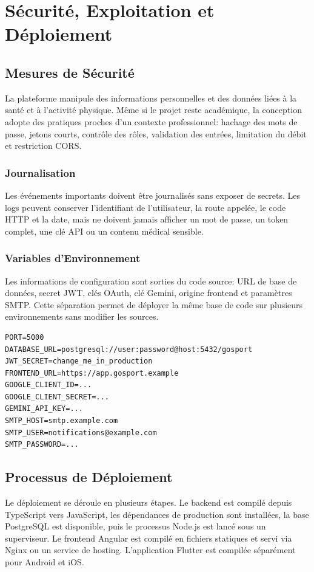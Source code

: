 \chapter{Sécurité, Exploitation et Déploiement}
\minitoc
\newpage

\section{Mesures de Sécurité}
La plateforme manipule des informations personnelles et des données liées à la santé et à l'activité physique. Même si le projet reste académique, la conception adopte des pratiques proches d'un contexte professionnel: hachage des mots de passe, jetons courts, contrôle des rôles, validation des entrées, limitation du débit et restriction CORS.

\subsection{Journalisation}
Les événements importants doivent être journalisés sans exposer de secrets. Les logs peuvent conserver l'identifiant de l'utilisateur, la route appelée, le code HTTP et la date, mais ne doivent jamais afficher un mot de passe, un token complet, une clé API ou un contenu médical sensible.

\subsection{Variables d'Environnement}
Les informations de configuration sont sorties du code source: URL de base de données, secret JWT, clés OAuth, clé Gemini, origine frontend et paramètres SMTP. Cette séparation permet de déployer la même base de code sur plusieurs environnements sans modifier les sources.

\begin{lstlisting}[caption=Exemple de variables d'environnement attendues]
PORT=5000
DATABASE_URL=postgresql://user:password@host:5432/gosport
JWT_SECRET=change_me_in_production
FRONTEND_URL=https://app.gosport.example
GOOGLE_CLIENT_ID=...
GOOGLE_CLIENT_SECRET=...
GEMINI_API_KEY=...
SMTP_HOST=smtp.example.com
SMTP_USER=notifications@example.com
SMTP_PASSWORD=...
\end{lstlisting}

\section{Processus de Déploiement}
Le déploiement se déroule en plusieurs étapes. Le backend est compilé depuis TypeScript vers JavaScript, les dépendances de production sont installées, la base PostgreSQL est disponible, puis le processus Node.js est lancé sous un superviseur. Le frontend Angular est compilé en fichiers statiques et servi via Nginx ou un service de hosting. L'application Flutter est compilée séparément pour Android et iOS.


